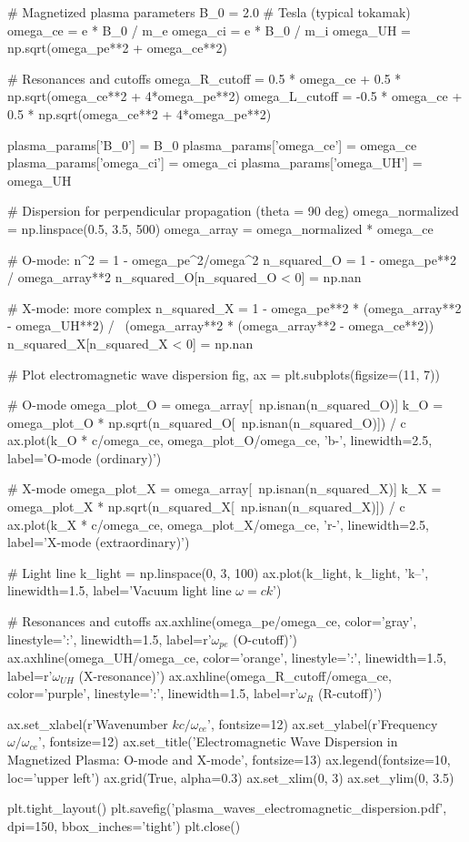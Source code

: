 \documentclass[11pt,a4paper]{article}
\begin{document}
\begin{pycode}
# Magnetized plasma parameters
B_0 = 2.0  # Tesla (typical tokamak)
omega_ce = e * B_0 / m_e
omega_ci = e * B_0 / m_i
omega_UH = np.sqrt(omega_pe**2 + omega_ce**2)

# Resonances and cutoffs
omega_R_cutoff = 0.5 * omega_ce + 0.5 * np.sqrt(omega_ce**2 + 4*omega_pe**2)
omega_L_cutoff = -0.5 * omega_ce + 0.5 * np.sqrt(omega_ce**2 + 4*omega_pe**2)

plasma_params['B_0'] = B_0
plasma_params['omega_ce'] = omega_ce
plasma_params['omega_ci'] = omega_ci
plasma_params['omega_UH'] = omega_UH

# Dispersion for perpendicular propagation (theta = 90 deg)
omega_normalized = np.linspace(0.5, 3.5, 500)
omega_array = omega_normalized * omega_ce

# O-mode: n^2 = 1 - omega_pe^2/omega^2
n_squared_O = 1 - omega_pe**2 / omega_array**2
n_squared_O[n_squared_O < 0] = np.nan

# X-mode: more complex
n_squared_X = 1 - omega_pe**2 * (omega_array**2 - omega_UH**2) / \
              (omega_array**2 * (omega_array**2 - omega_ce**2))
n_squared_X[n_squared_X < 0] = np.nan

# Plot electromagnetic wave dispersion
fig, ax = plt.subplots(figsize=(11, 7))

# O-mode
omega_plot_O = omega_array[~np.isnan(n_squared_O)]
k_O = omega_plot_O * np.sqrt(n_squared_O[~np.isnan(n_squared_O)]) / c
ax.plot(k_O * c/omega_ce, omega_plot_O/omega_ce, 'b-',
        linewidth=2.5, label='O-mode (ordinary)')

# X-mode
omega_plot_X = omega_array[~np.isnan(n_squared_X)]
k_X = omega_plot_X * np.sqrt(n_squared_X[~np.isnan(n_squared_X)]) / c
ax.plot(k_X * c/omega_ce, omega_plot_X/omega_ce, 'r-',
        linewidth=2.5, label='X-mode (extraordinary)')

# Light line
k_light = np.linspace(0, 3, 100)
ax.plot(k_light, k_light, 'k--', linewidth=1.5,
        label='Vacuum light line $\omega = ck$')

# Resonances and cutoffs
ax.axhline(omega_pe/omega_ce, color='gray', linestyle=':',
           linewidth=1.5, label=r'$\omega_{pe}$ (O-cutoff)')
ax.axhline(omega_UH/omega_ce, color='orange', linestyle=':',
           linewidth=1.5, label=r'$\omega_{UH}$ (X-resonance)')
ax.axhline(omega_R_cutoff/omega_ce, color='purple', linestyle=':',
           linewidth=1.5, label=r'$\omega_R$ (R-cutoff)')

ax.set_xlabel(r'Wavenumber $kc/\omega_{ce}$', fontsize=12)
ax.set_ylabel(r'Frequency $\omega/\omega_{ce}$', fontsize=12)
ax.set_title('Electromagnetic Wave Dispersion in Magnetized Plasma: O-mode and X-mode',
             fontsize=13)
ax.legend(fontsize=10, loc='upper left')
ax.grid(True, alpha=0.3)
ax.set_xlim(0, 3)
ax.set_ylim(0, 3.5)

plt.tight_layout()
plt.savefig('plasma_waves_electromagnetic_dispersion.pdf', dpi=150, bbox_inches='tight')
plt.close()
\end{pycode}
\end{document}
